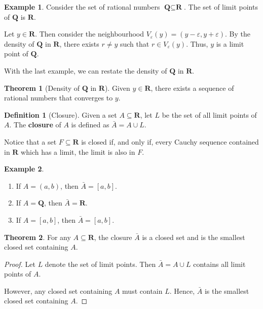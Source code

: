 \documentclass[12pt,a4paper]{article}
\theoremstyle{definition}
\newtheorem{theorem}{Theorem}[section]
\newtheorem{example}{Example}[section]
\newtheorem{definition}{Definition}[section]
\begin{document}
\begin{example}
	Consider the set of rational numbers $\textbf{Q} \subseteq \textbf{R}$. The set of limit points of $\textbf{Q}$ is $\textbf{R}$.
	
	Let $y \in \textbf{R}$. Then consider the neighbourhood $V_{\varepsilon}(y) = (y - \varepsilon, y + \varepsilon)$. By the density of $\textbf{Q}$ in $\textbf{R}$, there exists $r \neq y$ such that $r \in V_{\varepsilon}(y)$. Thus, $y$ is a limit point of $\textbf{Q}$.
\end{example}

With the last example, we can restate the density of $\textbf{Q}$ in $\textbf{R}$.

\begin{theorem}[Density of $\textbf{Q}$ in $\textbf{R}$]
	Given $y \in \textbf{R}$, there exists a sequence of rational numbers that converges to $y$. 
\end{theorem}

\begin{definition}[Closure]
	Given a set $A \subseteq \textbf{R}$, let $L$ be the set of all limit points of $A$. The \textbf{closure} of $A$ is defined as $\bar{A} = A \cup L$.
\end{definition}

Notice that a set $F \subseteq \textbf{R}$ is closed if, and only if, every Cauchy sequence contained in $\textbf{R}$ which has a limit, the limit is also in $F$.

\begin{example}
	\begin{enumerate}
		\item If $A = (a,b)$, then $\bar{A} = [a,b]$.
		\item If $A = \textbf{Q}$, then $\bar{A} = \textbf{R}$.
		\item If $A = [a,b]$, then $\bar{A} = [a,b]$.
	\end{enumerate}
\end{example}

\begin{theorem}
	For any $A \subseteq \textbf{R}$, the closure $\bar{A}$ is a closed set and is the smallest closed set containing $A$.
\end{theorem}

\begin{proof}
	Let $L$ denote the set of limit points. Then $\bar{A} = A \cup L$ contains all limit points of $A$.
	
	However, any closed set containing $A$ must contain $L$. Hence, $\bar{A}$ is the smallest closed set containing $A$.
\end{proof}
\end{document}
